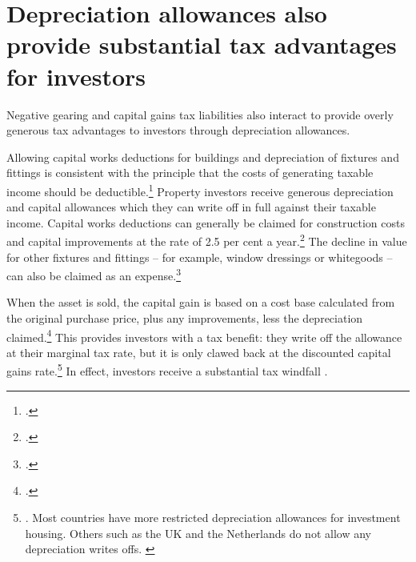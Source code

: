 \documentclass{grattan}\usepackage[]{graphicx}\usepackage[]{color}
\begin{document}
\section{Depreciation allowances also provide substantial tax advantages for investors}
Negative gearing and capital gains tax liabilities also interact to provide overly generous tax advantages to investors through depreciation allowances. 

Allowing capital works deductions for buildings and depreciation of fixtures and fittings is consistent with the principle that the costs of generating taxable income should be deductible.\footcite{Commission2004}  Property investors receive generous depreciation and capital allowances which they can write off in full against their taxable income. Capital works deductions can generally be claimed for construction costs and capital improvements at the rate of 2.5 per cent a year.\footcite{ATO2014b} The decline in value for other fixtures and fittings -- for example, window dressings or whitegoods -- can also be claimed as an expense.\footcite{ATO2014c}

When the asset is sold, the capital gain is based on a cost base calculated from the original purchase price, plus any improvements, less the depreciation claimed.\footcite[p.~21]{ATO2014d} This provides investors with a tax benefit: they write off the allowance at their marginal tax rate, but it is only clawed back at the discounted capital gains rate.\footnote{\textcite{RBA2014}. Most countries have more restricted depreciation allowances for investment housing. Others such as the UK and the Netherlands do not allow any depreciation writes offs. \textcite{Commission2004}}  In effect, investors receive a substantial tax windfall .  
\end{document}
